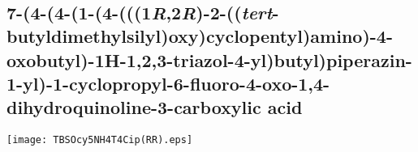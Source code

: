 \\[1\baselineskip]
\\[1\baselineskip]
\\[1\baselineskip]
\\[1\baselineskip]

\subsection{7\hyp{}(4\hyp{}(4\hyp{}(1\hyp{}(4\hyp{}(((1\textit{R},2\textit{R})\hyp{}2\hyp{}((\textit{tert}\hyp{}butyldimethylsilyl)oxy)cyclopentyl)amino)\hyp{}4\hyp{}oxobutyl)\hyp{}1H\hyp{}1,2,3\hyp{}triazol\hyp{}4\hyp{}yl)butyl)piperazin\hyp{}1\hyp{}yl)\hyp{}1\hyp{}cyclopropyl\hyp{}6\hyp{}fluoro\hyp{}4\hyp{}oxo\hyp{}1,4\hyp{}dihydroquinoline\hyp{}3\hyp{}carboxylic acid }


\begin{scheme}[H]
	\begin{center}
		\texttt{[image: TBSOcy5NH4T4Cip(RR).eps]}
	\end{center}
\end{scheme}

